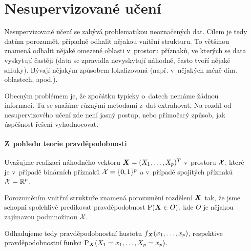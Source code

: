 \section{Nesupervizované učení}

Nesupervizované učení se zabývá problematikou neoznačených dat. Cílem je tedy datům porozumět, případně odhalit nějakou vnitřní strukturu. To většinou znamená odhalit nějaké omezené oblasti v~prostoru příznaků, ve kterých se data vyskytují častěji (data se zpravidla nevyskytují náhodně, často tvoří nějaké shluky). Bývají nějakým způsobem lokalizovaná (např. v~nějakých méně dim. oblastech, apod.).

Obecným problémem je, že zpočátku typicky o~datech nemáme žádnou informaci. Tu se snažíme různými metodami z~dat extrahovat. Na rozdíl od nesupervizového učení zde není jasný postup, nebo přímočarý způsob, jak úspěšnost řešení vyhodnocovat.

\paragraph{Z~pohledu teorie pravděpodobnosti} Uvažujme realizaci náhodného vektoru $\bm{X} = (X_1, \ldots, X_p)^T$ v~prostoru $\mathcal{X}$, které je v~případě binárních příznaků $\mathcal{X} = \{0,1\}^p$ a v~případě spojitých příznaků $\mathcal{X} = \mathbb{R}^p$.

Porozuměním vnitřní struktuře znamená porozumění rozdělení $\bm{X}$ tak, že jsme schopni spolehlivě predikovat pravděpodobnost $\text{P}(\bm{X} \in O)$, kde $O$ je nějakou zajímavou podmnožinou $\mathcal{X}$.

Odhadujeme tedy pravděpodobnostní hustotu $f_{\bm{X}}(x_1, \ldots, x_p)$, respektive pravděpodobnostní funkci $\text{P}_{\bm{X}}(X_1 = x_1, \ldots, X_p = x_p)$.
